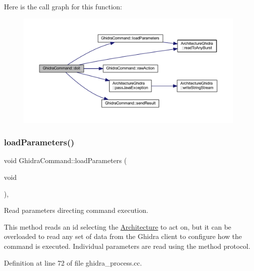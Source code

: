 Here is the call graph for this function\+:
\nopagebreak
\begin{figure}[H]
\begin{center}
\leavevmode
\includegraphics[width=350pt]{class_ghidra_command_a60d65958413c0e4669768332fa0f0476_cgraph}
\end{center}
\end{figure}
\mbox{\label{class_ghidra_command_a3e92d63544a9e5a36f27f6c3b177b28a}} 
\subsubsection{\texorpdfstring{loadParameters()}{loadParameters()}}
{\footnotesize\ttfamily void Ghidra\+Command\+::load\+Parameters (\begin{DoxyParamCaption}\item[{void}]{ }\end{DoxyParamCaption})\hspace{0.3cm}{\ttfamily [protected]}, {\ttfamily [virtual]}}



Read parameters directing command execution. 

This method reads an id selecting the \mbox{\hyperlink{class_architecture}{Architecture}} to act on, but it can be overloaded to read any set of data from the Ghidra client to configure how the command is executed. Individual parameters are read using the method protocol. 

Definition at line 72 of file ghidra\+\_\+process.\+cc.

